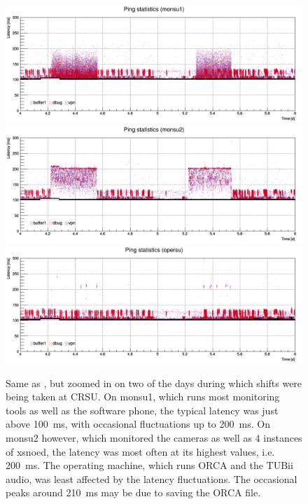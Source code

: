 \documentclass[a4paper,10pt]{article}
\begin{document}
\begin{figure}[htp]
	\centering
	\includegraphics[width=\textwidth]{images//monsu1_latency_zoom_shift}\\
	\includegraphics[width=\textwidth]{images//monsu2_latency_zoom_shift}\\
	\includegraphics[width=\textwidth]{images//opersu_latency_zoom_shift}
	\caption{Same as , but zoomed in on two of the days during which shifts were being taken at CRSU. On monsu1, which runs most monitoring tools as well as the software phone, the typical latency was just above 100~ms, with occasional fluctuations up to 200~ms. On monsu2 however, which monitored the cameras as well as 4 instances of xsnoed, the latency was most often at its highest values, i.e. 200~ms. The operating machine, which runs ORCA and the TUBii audio, was least affected by the latency fluctuations. The occasional peaks around 210~ms may be due to saving the ORCA file.}
	\label{latency_final_3}
\end{figure}
\end{document}

